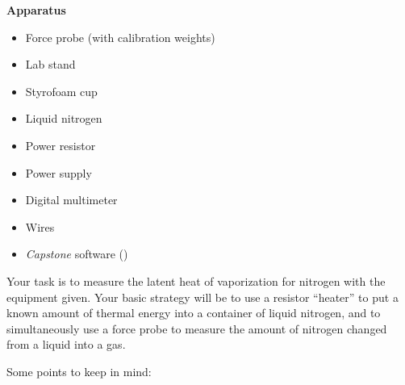 \textbf{Apparatus}
\begin{itemize}
\item Force probe (with calibration weights)
\item Lab stand
\item Styrofoam cup
\item Liquid nitrogen
\item Power resistor
\item Power supply
\item Digital multimeter
\item Wires
\item \textit{Capstone} software ()
\end{itemize}

Your task is to measure the latent heat of vaporization for nitrogen with the equipment given.
Your basic strategy will be to use a resistor ``heater'' to put a known amount of thermal
energy into a container of liquid nitrogen, and to simultaneously use a force probe to
measure the amount of nitrogen changed from a liquid into a gas.

Some points to keep in mind:


